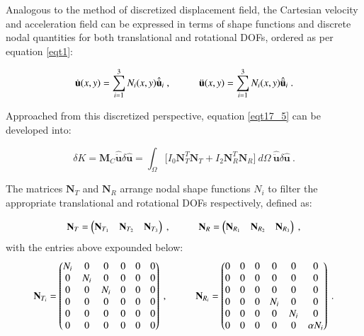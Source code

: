 Analogous to the method of discretized displacement field, the Cartesian velocity and acceleration field can be expressed in terms of shape functions and discrete nodal quantities for both translational and rotational DOFs, ordered as per equation \ref{eqt1}:

\begin{equation} 
\dot{\mathbf{u}} (x,y)
=
\sum_{i=1}^{3} N_i (x,y)
\hat{\dot{\mathbf{u}}}_i\ ,
\hspace{10mm}
\ddot{\mathbf{u}} (x,y)
=
\sum_{i=1}^{3} N_i (x,y)
\hat{\ddot{\mathbf{u}}}_i\ .
\label{eqt17_6}
\end{equation}

Approached from this discretized perspective, equation \ref{eqt17_5} can be developed into:

\begin{equation} 
\delta K = \mathbf{M}_C \hat{\ddot{\mathbf{{u}}}} \delta \hat{\mathbf{u}}
=
\int_{\Omega} 
\Big[I_0
\mathbf{N}_T^T
\mathbf{N}_T
+
I_2
\mathbf{N}_R^T
\mathbf{N}_R
\Big]
\ d\Omega\ 
\hat{\ddot{\mathbf{{u}}}}
\delta \hat{\mathbf{u}}
\label{eqt17_7}\ .
\end{equation}

The matrices $\mathbf{N}_T$ and $\mathbf{N}_R$ arrange nodal shape functions $N_i$ to filter the appropriate translational and rotational DOFs respectively, defined as:

\begin{equation} 
\mathbf{N}_T = 
\begin{pmatrix}
\mathbf{N}_{T_1} & \mathbf{N}_{T_2} & \mathbf{N}_{T_3}
\end{pmatrix}\ ,
\hspace{10mm}
\mathbf{N}_R = 
\begin{pmatrix}
\mathbf{N}_{R_1} & \mathbf{N}_{R_2} & \mathbf{N}_{R_3}
\end{pmatrix}
\label{eqt17_8}\ ,
\end{equation}
with the entries above expounded below:
\begin{equation} 
\mathbf{N}_{T_i} = 
\begin{pmatrix}
N_i & 0 & 0 & 0 & 0 & 0 \\
0 & N_i & 0 & 0 & 0 & 0 \\
0 & 0 & N_i & 0 & 0 & 0 \\
0 & 0 & 0 & 0 & 0 & 0 \\
0 & 0 & 0 & 0 & 0 & 0 \\
0 & 0 & 0 & 0 & 0 & 0
\end{pmatrix}\ ,
\hspace{10mm}
\mathbf{N}_{R_i} = 
\begin{pmatrix}
0 & 0 & 0 & 0 & 0 & 0 \\
0 & 0 & 0 & 0 & 0 & 0 \\
0 & 0 & 0 & 0 & 0 & 0 \\
0 & 0 & 0 & N_i & 0 & 0 \\
0 & 0 & 0 & 0 & N_i & 0 \\
0 & 0 & 0 & 0 & 0 & \alpha N_i
\end{pmatrix}
\label{eqt17_9}\ .
\end{equation}

